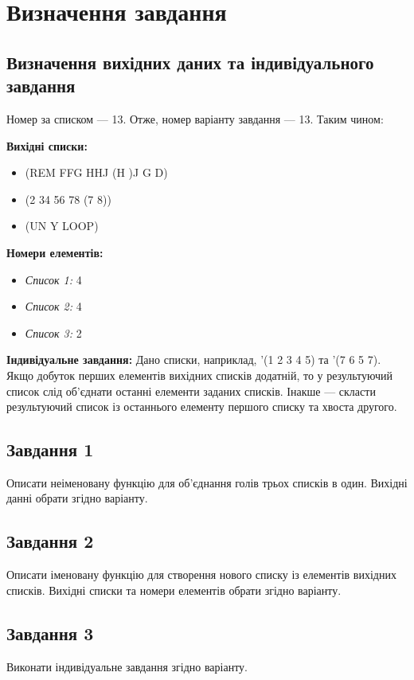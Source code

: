 \documentclass[a4paper, 10pt]{extarticle}
\begin{document}
\section{Визначення завдання}
\subsection{Визначення вихідних даних та індивідуального завдання}
Номер за списком --- 13. Отже, номер варіанту завдання --- 13.
Таким чином:

\textbf{Вихідні списки:}
\begin{itemize}
  \item (REM FFG HHJ (H )J G D)
  \item (2 34 56 78 (7 8))
  \item (UN Y LOOP)
\end{itemize}

\textbf{Номери елементів:}
\begin{itemize}
  \item \textit{Список 1:} 4
  \item \textit{Список 2:} 4
  \item \textit{Список 3:} 2
\end{itemize}

\textbf{Індивідуальне завдання:}
Дано списки, наприклад, '(1 2 3 4 5) та '(7 6 5 7). Якщо добуток перших елементів вихідних списків додатній, то у результуючий список слід об'єднати останні елементи заданих списків. Інакше --- скласти результуючий список із останнього елементу першого списку та хвоста другого.

\subsection{Завдання 1}
Описати неіменовану функцію для об'єднання голів трьох списків в один. Вихідні данні обрати згідно варіанту.

\subsection{Завдання 2}
Описати іменовану функцію для створення нового списку із елементів вихідних списків. Вихідні списки та номери елементів обрати згідно варіанту.

\subsection{Завдання 3}
Виконати індивідуальне завдання згідно варіанту.
\end{document}

